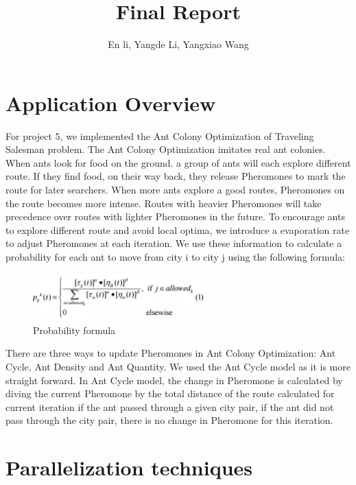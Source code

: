 \documentclass[11pt, letterpaper]{article}
\title{\textbf{Final Report}}
\author{En li, Yangde Li, Yangxiao Wang}
\begin{document}
	
	\maketitle
	
	\tableofcontents
	\pagebreak
	
	\section{Application Overview}
	For project 5, we implemented the Ant Colony Optimization of Traveling Salesman problem. The Ant Colony Optimization imitates real ant colonies. When ants look for food on the ground. a group of ants will each explore different route. If they find food, on their way back, they release Pheromones to mark the route for later searchers. When more ants explore a good routes, Pheromones on the route becomes more intense. Routes with heavier Pheromones will take precedence over routes with lighter Pheromones in the future. To encourage ants to explore different route and avoid local optima, we introduce a evaporation rate to adjust Pheromones at each iteration. We use these information to calculate a probability for each ant to move from city i to city j using the following formula: \par
	\begin{figure}[!htb]
		\centering
		\includegraphics[width=0.6\textwidth]{sum}
		\caption{Probability formula}
	\end{figure}
	There are three ways to update Pheromones in Ant Colony Optimization:  Ant Cycle, Ant Density and Ant Quantity. We used the Ant Cycle model as it is more straight forward. In Ant Cycle model, the change in Pheromone is calculated by diving the current Pheromone by the total distance of the route calculated for current iteration if the ant passed through a given city pair, if the ant did not pass through the city pair, there is no change in Pheromone for this iteration.
	
	
	\section {Parallelization techniques}
	
\end{document}
